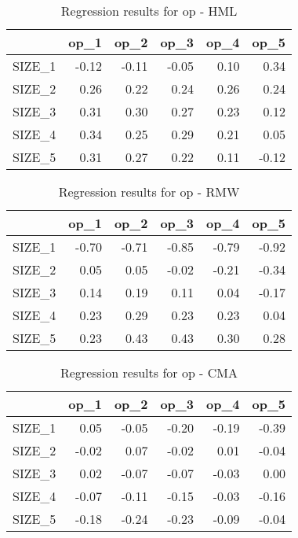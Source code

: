 \begin{table}[ht]
\centering
\caption{Regression results for op - HML} 
\begin{tabular}{rrrrrr}
  \hline
 & op\_1 & op\_2 & op\_3 & op\_4 & op\_5 \\ 
  \hline
SIZE\_1 & -0.12 & -0.11 & -0.05 & 0.10 & 0.34 \\ 
  SIZE\_2 & 0.26 & 0.22 & 0.24 & 0.26 & 0.24 \\ 
  SIZE\_3 & 0.31 & 0.30 & 0.27 & 0.23 & 0.12 \\ 
  SIZE\_4 & 0.34 & 0.25 & 0.29 & 0.21 & 0.05 \\ 
  SIZE\_5 & 0.31 & 0.27 & 0.22 & 0.11 & -0.12 \\ 
   \hline
\end{tabular}
\end{table}


\begin{table}[ht]
\centering
\caption{Regression results for op - RMW} 
\begin{tabular}{rrrrrr}
  \hline
 & op\_1 & op\_2 & op\_3 & op\_4 & op\_5 \\ 
  \hline
SIZE\_1 & -0.70 & -0.71 & -0.85 & -0.79 & -0.92 \\ 
  SIZE\_2 & 0.05 & 0.05 & -0.02 & -0.21 & -0.34 \\ 
  SIZE\_3 & 0.14 & 0.19 & 0.11 & 0.04 & -0.17 \\ 
  SIZE\_4 & 0.23 & 0.29 & 0.23 & 0.23 & 0.04 \\ 
  SIZE\_5 & 0.23 & 0.43 & 0.43 & 0.30 & 0.28 \\ 
   \hline
\end{tabular}
\end{table}


\begin{table}[ht]
\centering
\caption{Regression results for op - CMA} 
\begin{tabular}{rrrrrr}
  \hline
 & op\_1 & op\_2 & op\_3 & op\_4 & op\_5 \\ 
  \hline
SIZE\_1 & 0.05 & -0.05 & -0.20 & -0.19 & -0.39 \\ 
  SIZE\_2 & -0.02 & 0.07 & -0.02 & 0.01 & -0.04 \\ 
  SIZE\_3 & 0.02 & -0.07 & -0.07 & -0.03 & 0.00 \\ 
  SIZE\_4 & -0.07 & -0.11 & -0.15 & -0.03 & -0.16 \\ 
  SIZE\_5 & -0.18 & -0.24 & -0.23 & -0.09 & -0.04 \\ 
   \hline
\end{tabular}
\end{table}


